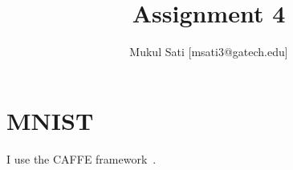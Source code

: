 \documentclass[5pt]{article}
\begin{document}
\title{Assignment 4}
\author{Mukul Sati [msati3@gatech.edu]}
\maketitle

\section{MNIST}
I use the CAFFE framework~\cite{jia2014caffe}.

\medskip


\end{document}
